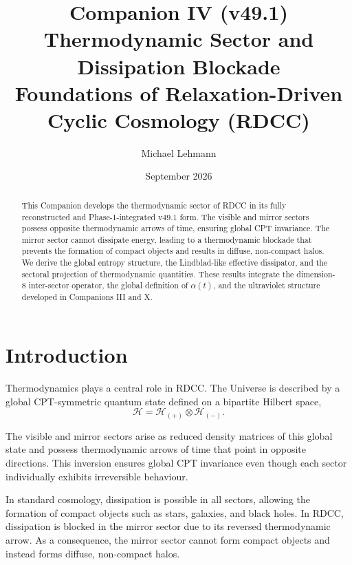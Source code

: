 \documentclass[11pt,a4paper]{article}
\title{\textbf{Companion IV (v49.1)}\\[0.2cm]
\textbf{Thermodynamic Sector and Dissipation Blockade}\\[0.2cm]
\large Foundations of Relaxation-Driven Cyclic Cosmology (RDCC)}
\author[1]{Michael Lehmann}
\affil[1]{\small Independent Researcher, Relaxation-Driven Cyclic Cosmology (RDCC)\\
\texttt{mi.lehmann@gmx.de}}
\date{September 2026}
\begin{document}
\maketitle


\begin{abstract}
This Companion develops the thermodynamic sector of RDCC in its fully
reconstructed and Phase-1-integrated v49.1 form. The visible and mirror sectors
possess opposite thermodynamic arrows of time, ensuring global CPT invariance.
The mirror sector cannot dissipate energy, leading to a thermodynamic blockade
that prevents the formation of compact objects and results in diffuse,
non-compact halos. We derive the global entropy structure, the Lindblad-like
effective dissipator, and the sectoral projection of thermodynamic quantities.
These results integrate the dimension-8 inter-sector operator, the global
definition of $\alpha(t)$, and the ultraviolet structure developed in
Companions III and X.
\end{abstract}

\tableofcontents
\newpage

\section{Introduction}

Thermodynamics plays a central role in RDCC. The Universe is described by a
global CPT-symmetric quantum state defined on a bipartite Hilbert space,
\begin{equation}
\mathcal{H} = \mathcal{H}_{(+)} \otimes \mathcal{H}_{(-)}.
\end{equation}

The visible and mirror sectors arise as reduced density matrices of this global
state and possess thermodynamic arrows of time that point in opposite
directions. This inversion ensures global CPT invariance even though each
sector individually exhibits irreversible behaviour.

In standard cosmology, dissipation is possible in all sectors, allowing the
formation of compact objects such as stars, galaxies, and black holes. In RDCC,
dissipation is blocked in the mirror sector due to its reversed thermodynamic
arrow. As a consequence, the mirror sector cannot form compact objects and
instead forms diffuse, non-compact halos.
\end{document}
